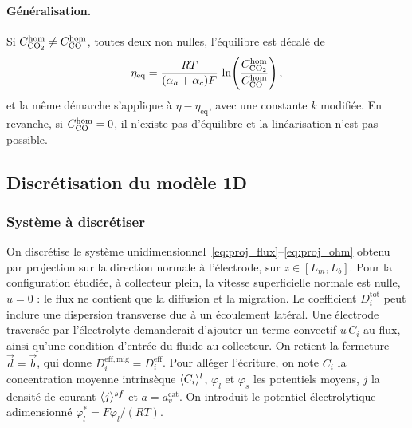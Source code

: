 \paragraph{Généralisation.} Si $C_{\ce{CO2}}^{\mathrm{hom}} \neq C_{\ce{CO}}^{\mathrm{hom}}$,
toutes deux non nulles, l'équilibre est décalé de
\begin{equation*}
\eta_{\mathrm{eq}} = \frac{RT}{(\alpha_a + \alpha_c)F}\,
\ln\!\left(\frac{C_{\ce{CO2}}^{\mathrm{hom}}}{C_{\ce{CO}}^{\mathrm{hom}}}\right),
\end{equation*}
et la même démarche s'applique à $\eta - \eta_{\mathrm{eq}}$, avec une
constante $k$ modifiée. En revanche, si $C_{\ce{CO}}^{\mathrm{hom}} = 0$, il
n'existe pas d'équilibre et la linéarisation n'est pas possible.

\subsection*{Discrétisation du modèle 1D}

\subsubsection*{Système à discrétiser}

On discrétise le système unidimensionnel~\eqref{eq:proj_flux}--\eqref{eq:proj_ohm}
obtenu par projection sur la direction normale à l'électrode, sur
$z \in [L_m, L_b]$. Pour la configuration étudiée, à collecteur plein, la
vitesse superficielle normale est nulle, $u = 0$ : le flux ne contient que
la diffusion et la migration. Le coefficient $D_i^{\mathrm{tot}}$ peut
inclure une dispersion transverse due à un écoulement latéral. Une électrode
traversée par l'électrolyte demanderait d'ajouter un terme convectif $u\,C_i$
au flux, ainsi qu'une condition d'entrée du fluide au collecteur. On retient la fermeture $\vec{d} = \vec{b}$, qui donne
$D_i^{\mathrm{eff,mig}} = D_i^{\mathrm{eff}}$. Pour alléger l'écriture, on
note $C_i$ la concentration moyenne intrinsèque $\langle C_i \rangle^l$, $\varphi_l$ et
$\varphi_s$ les potentiels moyens, $j$ la densité de courant
$\langle j \rangle^{sf}$ et $a = a_v^{\mathrm{cat}}$. On introduit le potentiel
électrolytique adimensionné $\varphi_l^* = F\varphi_l/(RT)$.

